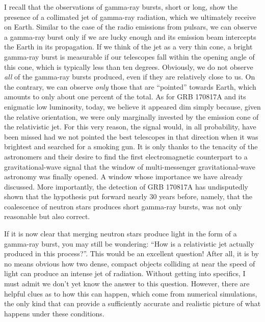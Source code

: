 I recall that the observations of gamma-ray bursts, short or long, show the presence of
a collimated jet of gamma-ray radiation, which we ultimately receive on Earth. Similar
to the case of the radio emissions from pulsars, we can observe a gamma-ray burst only
if we are lucky enough and its emission beam intercepts the Earth in its propagation. If
we think of the jet as a very thin cone, a bright gamma-ray burst is measurable if our
telescopes fall within the opening angle of this cone, which is typically less than ten
degrees. Obviously, we do not observe \emph{all} of the gamma-ray
bursts produced, even if they are relatively close to us. On the
contrary, we can observe \emph{only} those that are ``pointed'' towards Earth, which
amounts to only about one percent of the total. As for GRB 170817A
and its enigmatic low luminosity, today, we believe it appeared dim simply because,
given the relative orientation, we were only marginally invested by the emission cone of
the relativistic jet. For this very reason, the signal would, in all probability, have
been missed had we not pointed the best telescopes in that direction when it was
brightest and searched for a smoking gun. It is only thanks to the tenacity of the
astronomers and their desire to find the first electromagnetic
counterpart to a gravitational-wave signal that the window of
multi-messenger gravitational-wave astronomy was finally opened. A window whose
importance we have already discussed. More importantly, the detection of GRB 170817A has
undisputedly shown that the hypothesis put forward nearly 30 years before, namely, that
the coalescence of neutron stars produces short gamma-ray bursts, was not only
reasonable but also correct.

If it is now clear that merging neutron stars produce light in the form of a gamma-ray
burst, you may still be wondering: ``How is a relativistic
jet actually produced in this process?''. This would be an excellent
question! After all, it is by no means obvious how two dense, compact objects colliding
at near the speed of light can produce an intense jet of radiation. Without getting into
specifics, I must admit we don't yet know the answer to this question. However, there
are helpful clues as to how this can happen, which come from numerical simulations, the
only kind that can provide a sufficiently accurate and realistic picture of what happens
under these conditions.

